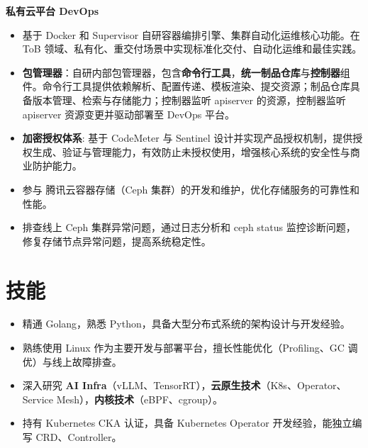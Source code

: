 \documentclass{resume}
\begin{document}
\textbf{私有云平台 DevOps}
\begin{itemize}[parsep=0.5ex]
  \item 基于 Docker 和 Supervisor 自研容器编排引擎、集群自动化运维核心功能。在 ToB 领域、私有化、重交付场景中实现标准化交付、自动化运维和最佳实践。
  \item \textbf{包管理器}：自研内部包管理器，包含\textbf{命令行工具}，\textbf{统一制品仓库}与\textbf{控制器}组件。命令行工具提供依赖解析、配置传递、模板渲染、提交资源；制品仓库具备版本管理、检索与存储能力；控制器监听 apiserver 的资源，控制器监听 apiserver 资源变更并驱动部署至 DevOps 平台。
  \item \textbf{加密授权体系}: 基于 CodeMeter 与 Sentinel 设计并实现产品授权机制，提供授权生成、验证与管理能力，有效防止未授权使用，增强核心系统的安全性与商业防护能力。
\end{itemize}

\begin{itemize}[parsep=0.5ex]
  \item 参与 腾讯云容器存储（Ceph 集群）的开发和维护，优化存储服务的可靠性和性能。
  \item 排查线上 Ceph 集群异常问题，通过日志分析和 ceph status 监控诊断问题，修复存储节点异常问题，提高系统稳定性。
\end{itemize}


\section{技能}
\begin{itemize}[parsep=0.5ex]
  \item 精通 Golang，熟悉 Python，具备大型分布式系统的架构设计与开发经验。
  \item 熟练使用 Linux 作为主要开发与部署平台，擅长性能优化（Profiling、GC 调优）与线上故障排查。
  \item 深入研究 \textbf{AI Infra}（vLLM、TensorRT），\textbf{云原生技术}（K8s、Operator、Service Mesh），\textbf{内核技术}（eBPF、cgroup）。
  \item 持有 Kubernetes CKA 认证，具备 Kubernetes Operator 开发经验，能独立编写 CRD、Controller。
\end{itemize}
\end{document}
